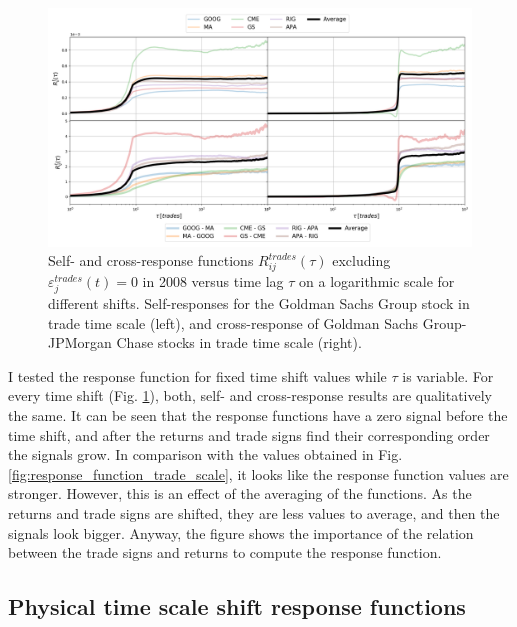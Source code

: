 \begin{figure}[htbp]
    \centering
    \includegraphics[width=\textwidth]{figures/04_shift_responses_trade.png}
    \caption{Self- and cross-response functions
             $R^{trades}_{ij}\left(\tau\right)$ excluding
             $\varepsilon^{trades}_{j}\left(t\right) = 0$ in 2008 versus time
             lag $\tau$ on a logarithmic scale for different shifts.
             Self-responses for the Goldman Sachs Group stock in trade time
             scale (left), and cross-response of Goldman Sachs Group-JPMorgan
             Chase stocks in trade time scale (right).}
    \label{fig:shift_responses_trade_scale}
\end{figure}

I tested the response function for fixed time shift values while $\tau$ is variable.
For every time shift (Fig. \ref{fig:shift_responses_trade_scale}), both, self- and cross-response
results are qualitatively the same. It can be seen
that the response functions have a zero signal before the time shift, and after the
returns and trade signs find their corresponding order the signals grow. In comparison
with the values obtained in Fig. \ref{fig:response_function_trade_scale}, it looks
like the response function values are stronger. However, this is an effect of the
averaging of the functions. As the returns and trade signs are shifted, they are
less values to average, and then the signals look bigger. Anyway, the figure shows the
importance of the relation between the trade signs and returns to compute the response function.

\subsection{Physical time scale shift response functions}
\label{subsec:time_shift_physical}

